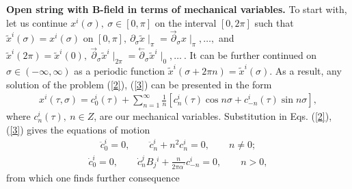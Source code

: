 \documentclass[a4paper]{article}
\begin{document}
\noindent
{\bf Open string with B-field in terms of mechanical variables.} 
To start with, let us continue $x^i(\sigma), ~ \sigma\in [0, \pi ]$ on the interval 
$[0, 2\pi]$ such that $\tilde x^i(\sigma)=x^i(\sigma)$ on $[0, \pi], ~ 
\partial_\sigma\tilde x\mid_\pi=\vec\partial_\sigma x\mid_\pi, \ldots ,$ 
and $\tilde x^i(2\pi)=\tilde x^i(0), ~ \vec\partial_\sigma\tilde x^i
\mid_{2\pi}=\stackrel{\leftarrow}{\partial}_\sigma
\tilde x^i\mid_0, \ldots ~.$ It can be 
further continued on $\sigma\in(-\infty, \infty)$ as a periodic function 
$\tilde x^i(\sigma +2\pi n)=\tilde x^i(\sigma)$. As a result, any 
solution of the problem (\ref{2}), (\ref{3}) can be presented in the form 
\begin{eqnarray}\label{4}
x^i(\tau, \sigma)=c_0^i(\tau)+\sum_{n=1}^\infty\frac 1n
\left[c_n^i(\tau) \cos n\sigma+c_{-n}^i(\tau)\sin n\sigma\right],
\end{eqnarray}
where $c_n^i(\tau), ~ n\in Z$, are our mechanical variables. Substitution 
in Eqs. (\ref{2}), (\ref{3}) gives the equations of motion 
\begin{eqnarray}\label{5}
\ddot c_0^i=0, \qquad \ddot c_n^i+n^2c_n^i=0, \qquad n\ne 0; 
\end{eqnarray}
\begin{eqnarray}\label{6}
\dot c_0^i=0, \qquad \dot c_n^jB_j{}^i+
\frac{n}{2\pi\alpha^\prime}c_{-n}^i=0, 
\qquad n>0,
\end{eqnarray}
from which one finds further consequence
 
\end{document}

